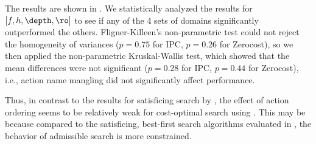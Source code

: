 The results are shown in .
We statistically analyzed the results for $[f,h,\depth,\ro]$ 
to see if any of the 4 sets of domains
significantly outperformed the others.
Fligner-Killeen's non-parametric test could not reject the homogeneity of variances
($p=0.75$ for IPC, $p=0.26$ for Zerocost), so
we then applied the non-parametric Kruskal-Wallis test,
which showed that the mean differences were not significant
($p=0.28$ for IPC, $p=0.44$ for Zerocost),
i.e., action name mangling did not significantly affect performance.

Thus, in contrast to the results for satisficing search by \cite{vallati2015effective}, 
the effect of action ordering  seems to be relatively weak for cost-optimal search using \astar.
This may be because 
compared to the satisficing, best-first search algorithms evaluated in \cite{vallati2015effective},
the behavior of admissible search is more constrained.


